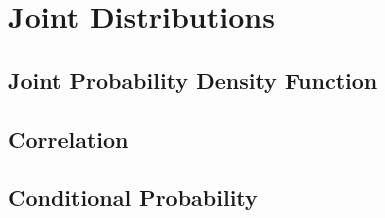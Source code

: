 \chapter{Joint Distributions} \label{ch:jd}

\section{Joint Probability Density Function}

\section{Correlation}

\section{Conditional Probability}



